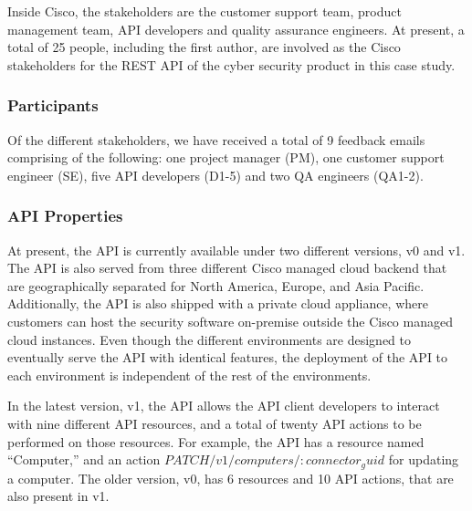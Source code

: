 \documentclass[10pt, conference]{IEEEtran}
\begin{document}
Inside Cisco, the stakeholders are the customer support team, product management team, API developers and quality assurance engineers. At present, a total of 25 people, including the first author, are involved as the Cisco stakeholders for the REST API of the cyber security product in this case study.

\subsubsection{Participants}
Of the different stakeholders, we have received a total of 9 feedback emails comprising of the following: one project manager (PM), one customer support engineer (SE), five API developers (D1-5) and two QA engineers (QA1-2).

\subsubsection{API Properties} %
At present, the API is currently available under two different versions, v0 and v1. The API is also served from three different Cisco managed cloud backend that are geographically separated for North America, Europe, and Asia Pacific. Additionally, the API is also shipped with a private cloud appliance, where customers can host the security software on-premise outside the Cisco managed cloud instances. Even though the different environments are designed to eventually serve the API with identical features, the deployment of the API to each environment is independent of the rest of the environments.

In the latest version, v1, the API allows the API client developers to interact with nine different API resources, and a total of twenty API actions to be performed on those resources. For example, the API has a resource named ``Computer,'' and an action $PATCH /v1/computers/{:connector_guid}$ for updating a computer. The older version, v0, has 6 resources and 10 API actions, that are also present in v1.
\end{document}
